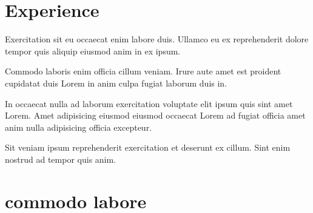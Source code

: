 \documentclass[a4paper]{deedy-resume} %
\begin{document}
\begin{minipage}[t]{0.66\textwidth} %


\section{Experience}



  Exercitation sit eu occaecat enim labore duis. Ullamco eu ex reprehenderit dolore tempor quis aliquip eiusmod anim in ex ipsum.

  \sectionspace %


  Commodo laboris enim officia cillum veniam. Irure aute amet est proident cupidatat duis Lorem in anim culpa fugiat laborum duis in.

  \sectionspace %


  In occaecat nulla ad laborum exercitation voluptate elit ipsum quis sint amet Lorem. Amet adipisicing eiusmod eiusmod occaecat Lorem ad fugiat officia amet anim nulla adipisicing officia excepteur.

  \sectionspace %


  Sit veniam ipsum reprehenderit exercitation et deserunt ex cillum. Sint enim nostrud ad tempor quis anim.

  \sectionspace %



  \section{commodo labore}
      \descript{}


\end{minipage}
\end{document}
